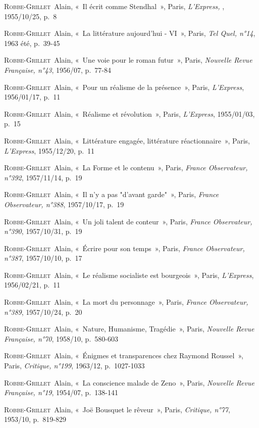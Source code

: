 \documentclass[12pt, a4paper]{article}
\begin{document}
        
        \textsc{Robbe-Grillet}~Alain, «~Il écrit comme Stendhal~», Paris, \textit{L'Express, }, 1955/10/25, p.~8\par
    \textsc{Robbe-Grillet}~Alain, «~La littérature aujourd'hui - VI~», Paris, \textit{Tel Quel, n°14}, 1963 été, p.~39-45\par
    \textsc{Robbe-Grillet}~Alain, «~Une voie pour le roman futur~», Paris, \textit{Nouvelle Revue Française, n°43}, 1956/07, p.~77-84\par
    \textsc{Robbe-Grillet}~Alain, «~Pour un réalisme de la présence~», Paris, \textit{L'Express}, 1956/01/17, p.~11\par
    \textsc{Robbe-Grillet}~Alain, «~Réalisme et révolution~», Paris, \textit{L'Express}, 1955/01/03, p.~15\par
    \textsc{Robbe-Grillet}~Alain, «~Littérature engagée, littérature réactionnaire~», Paris, \textit{L'Express}, 1955/12/20, p.~11\par
    \textsc{Robbe-Grillet}~Alain, «~La Forme et le contenu~», Paris, \textit{France Observateur, n°392}, 1957/11/14, p.~19\par
    \textsc{Robbe-Grillet}~Alain, «~Il n'y a pas "d'avant garde"~», Paris, \textit{France Observateur, n°388}, 1957/10/17, p.~19\par
    \textsc{Robbe-Grillet}~Alain, «~Un joli talent de conteur~», Paris, \textit{France Observateur, n°390}, 1957/10/31, p.~19\par
    \textsc{Robbe-Grillet}~Alain, «~Écrire pour son temps~», Paris, \textit{France Observateur, n°387}, 1957/10/10, p.~17\par
    \textsc{Robbe-Grillet}~Alain, «~Le réalisme socialiste est bourgeois~», Paris, \textit{L'Express}, 1956/02/21, p.~11\par
    \textsc{Robbe-Grillet}~Alain, «~La mort du personnage~», Paris, \textit{France Observateur, n°389}, 1957/10/24, p.~20\par
    \textsc{Robbe-Grillet}~Alain, «~Nature, Humanisme, Tragédie~», Paris, \textit{Nouvelle Revue Française, n°70}, 1958/10, p.~580-603\par
    \textsc{Robbe-Grillet}~Alain, «~Énigmes et transparences chez Raymond Roussel~», Paris, \textit{Critique, n°199}, 1963/12, p.~1027-1033\par
    \textsc{Robbe-Grillet}~Alain, «~La conscience malade de Zeno~», Paris, \textit{Nouvelle Revue Française, n°19}, 1954/07, p.~138-141\par
    \textsc{Robbe-Grillet}~Alain, «~Joë Bousquet le rêveur~», Paris, \textit{Critique, n°77}, 1953/10, p.~819-829\par
\end{document}
